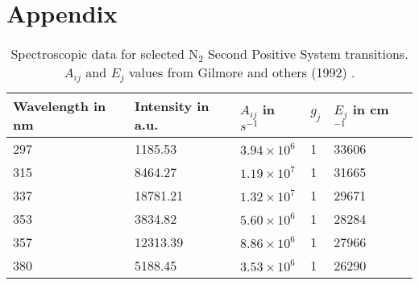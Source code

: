 \appendix
\chapter{Appendix}
\begin{table}[h]
    \centering
    \caption[$A_{ij}$ and $E_j$ values for selected N$_2$ 2PS transitions]{Spectroscopic data for selected N$_2$ Second Positive System transitions. $A_{ij}$ and $E_j$ values from Gilmore and others (1992) \cite{coefficients}.}
    \vspace*{1em}
    \begin{tabular}{llllll}
    {Wavelength in nm} & {Intensity in a.u.} & $A_{ij}$ in {$s^{-1}$} & $g_j$ & $E_j$ in {cm$^{-1}$} \\
    \hline
    297 & 1185.53  & $3.94 \times 10^6$ & 1 & 33606 \\
    315 & 8464.27  & $1.19 \times 10^7$ & 1 & 31665 \\
    337 & 18781.21 & $1.32 \times 10^7$ & 1 & 29671 \\
    353 & 3834.82  & $5.60 \times 10^6$ & 1 & 28284 \\
    357 & 12313.39 & $8.86 \times 10^6$ & 1 & 27966 \\
    380 & 5188.45  & $3.53 \times 10^6$ & 1 & 26290 \\

    \end{tabular}
    \label{tab:boltzmann}
\end{table}